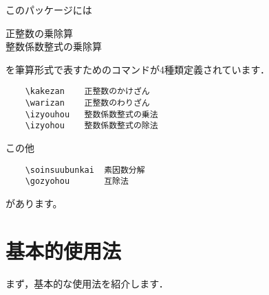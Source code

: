 \documentclass[fleqn]{jarticle}
\begin{document}
\openKaiFile
このパッケージには
\begin{jquote}
  正整数の乗除算\\
  整数係数整式の乗除算
\end{jquote}
を筆算形式で表すためのコマンドが4種類定義されています．
\begin{verbatim}
    \kakezan    正整数のかけざん
    \warizan    正整数のわりざん
    \izyouhou   整数係数整式の乗法
    \izyohou    整数係数整式の除法
\end{verbatim}

この他
\begin{verbatim}
    \soinsuubunkai  素因数分解
    \gozyohou       互除法
\end{verbatim}
があります。

\section{基本的使用法}
まず，基本的な使用法を紹介します．
\end{document}
